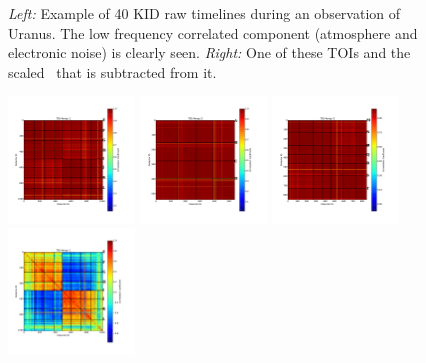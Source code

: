 \begin{figure}[ht!]
\begin{center}
\caption[Example of Time-Ordered-Information]{\emph{Left:} Example of 40 KID raw timelines during an observation
  of Uranus. The low frequency correlated component (atmosphere and electronic
  noise) is clearly seen. \emph{Right:} One of these TOIs and the scaled
  \cm\ that is subtracted from it.}
\label{fig:nika_toi}
\end{center}
\end{figure}

\begin{figure}[ht!] %
\begin{center}
\includegraphics[width=0.3\textwidth]{Figures/NoiseTests/corrmat_TOI_array_1_20170228s151.pdf}
\includegraphics[width=0.3\textwidth]{Figures/NoiseTests/corrmat_TOI_array_2_20170228s151.pdf}
\includegraphics[width=0.3\textwidth]{Figures/NoiseTests/corrmat_TOI_array_3_20170228s151.pdf}
\includegraphics[width=0.3\textwidth]{Figures/NoiseTests/corrmat_TOI_CM_array_1_20170228s151.pdf}

\end{center}
\end{figure}
